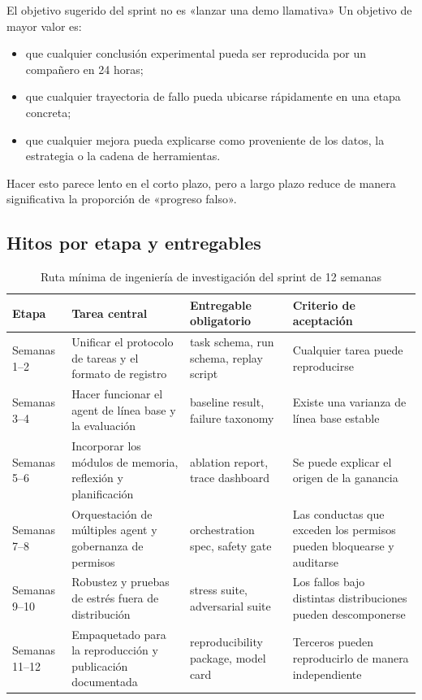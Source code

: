 \documentclass[a4paper]{article}
\begin{document}
\begin{importantbox}{El objetivo sugerido del sprint no es «lanzar una demo llamativa»}
Un objetivo de mayor valor es:
\begin{itemize}
    \item que cualquier conclusión experimental pueda ser reproducida por un compañero en 24 horas;
    \item que cualquier trayectoria de fallo pueda ubicarse rápidamente en una etapa concreta;
    \item que cualquier mejora pueda explicarse como proveniente de los datos, la estrategia o la cadena de herramientas.
\end{itemize}
Hacer esto parece lento en el corto plazo, pero a largo plazo reduce de manera significativa la proporción de «progreso falso».
\end{importantbox}

\subsection{Hitos por etapa y entregables}
\begin{table}[H]
\centering
\begin{tabular}{p{2.2cm}p{3.5cm}p{3.6cm}p{3.2cm}}
\toprule
\textbf{Etapa} & \textbf{Tarea central} & \textbf{Entregable obligatorio} & \textbf{Criterio de aceptación} \\
\midrule
Semanas 1--2 & Unificar el protocolo de tareas y el formato de registro & task schema, run schema, replay script & Cualquier tarea puede reproducirse \\
Semanas 3--4 & Hacer funcionar el agent de línea base y la evaluación & baseline result, failure taxonomy & Existe una varianza de línea base estable \\
Semanas 5--6 & Incorporar los módulos de memoria, reflexión y planificación & ablation report, trace dashboard & Se puede explicar el origen de la ganancia \\
Semanas 7--8 & Orquestación de múltiples agent y gobernanza de permisos & orchestration spec, safety gate & Las conductas que exceden los permisos pueden bloquearse y auditarse \\
Semanas 9--10 & Robustez y pruebas de estrés fuera de distribución & stress suite, adversarial suite & Los fallos bajo distintas distribuciones pueden descomponerse \\
Semanas 11--12 & Empaquetado para la reproducción y publicación documentada & reproducibility package, model card & Terceros pueden reproducirlo de manera independiente \\
\bottomrule
\end{tabular}
\caption{Ruta mínima de ingeniería de investigación del sprint de 12 semanas}
\end{table}
\end{document}
